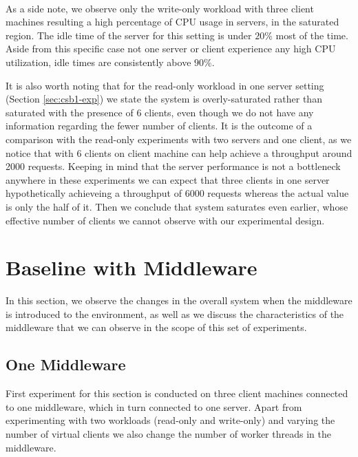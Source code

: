 \documentclass[11pt,a4paper]{article}
\begin{document}
\\
\par As a side note, we observe only the write-only workload with three client machines resulting a high percentage of CPU usage in servers, in the saturated region. The idle time of the server for this setting is under $20\%$ most of the time. Aside from this specific case not one server or client experience any high CPU utilization, idle times are consistently above $90\%$.
\par It is also worth noting that for the read-only workload in one server setting (Section \ref{sec:csb1-exp}) we state the system is overly-saturated rather than saturated with the presence of 6 clients, even though we do not have any information regarding the fewer number of clients. It is the outcome of a comparison with the read-only experiments with two servers and one client, as we notice that with 6 clients on client machine can help achieve a throughput around 2000 requests. Keeping in mind that the server performance is not a bottleneck anywhere in these experiments we can expect that three clients in one server hypothetically achieveing a throughput of 6000 requests whereas the actual value is only the half of it. Then we conclude that system saturates even earlier, whose effective number of clients we cannot observe with our experimental design.

\section{Baseline with Middleware} \label{sec:mwb}
In this section, we observe the changes in the overall system when the middleware is introduced to the environment, as well as we discuss the characteristics of the middleware that we can observe in the scope of this set of experiments. 

\subsection{One Middleware} \label{sec:mwb1}
First experiment for this section is conducted on three client machines connected to one middleware, which in turn connected to one server. Apart from experimenting with two workloads (read-only and write-only) and varying the number of virtual clients we also change the number of worker threads in the middleware.
\end{document}
